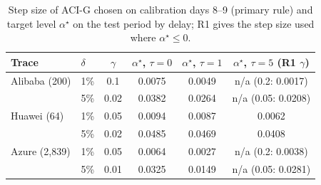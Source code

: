 \begin{table}[!htbp]\centering\footnotesize\setlength{\tabcolsep}{4pt}
\caption{Step size of ACI-G chosen on calibration days 8--9 (primary rule) and target level $\alpha^\star$ on the test period by delay; R1 gives the step size used where $\alpha^\star\le0$.}
\label{tab:aci_gamma}
\begin{tabular}{@{}llcccc@{}}\toprule
Trace & $\delta$ & $\gamma$ & $\alpha^\star$, $\tau=0$ & $\alpha^\star$, $\tau=1$ & $\alpha^\star$, $\tau=5$ (R1 $\gamma$) \\ \midrule
Alibaba (200) & 1\% & 0.1 & 0.0075 & 0.0049 & n/a (0.2: 0.0017) \\
 & 5\% & 0.02 & 0.0382 & 0.0264 & n/a (0.05: 0.0208) \\
Huawei (64) & 1\% & 0.05 & 0.0094 & 0.0087 & 0.0062 \\
 & 5\% & 0.02 & 0.0485 & 0.0469 & 0.0408 \\
Azure (2,839) & 1\% & 0.05 & 0.0064 & 0.0027 & n/a (0.2: 0.0038) \\
 & 5\% & 0.01 & 0.0325 & 0.0149 & n/a (0.05: 0.0281) \\
\bottomrule\end{tabular}\end{table}
